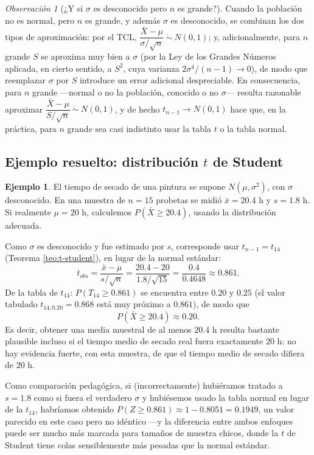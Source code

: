 \documentclass[11pt,a4paper]{article}
\theoremstyle{plain}
\theoremstyle{definition}
\newtheorem{ejemplo}[teorema]{Ejemplo}
\theoremstyle{remark}
\newtheorem{observacion}[teorema]{Observación}
\begin{document}
\begin{observacion}[¿Y si $\sigma$ es desconocido pero $n$ es grande?]
Cuando la población no es normal, pero $n$ es grande, y además $\sigma$ es desconocido, se combinan los dos tipos de aproximación: por el TCL, $\dfrac{\bar X-\mu}{\sigma/\sqrt n}\ \dot\sim\ N(0,1)$; y, adicionalmente, para $n$ grande $S$ se aproxima muy bien a $\sigma$ (por la Ley de los Grandes Números aplicada, en cierto sentido, a $S^2$, cuya varianza $2\sigma^4/(n-1)\to 0$), de modo que reemplazar $\sigma$ por $S$ introduce un error adicional despreciable. En consecuencia, para $n$ grande —normal o no la población, conocido o no $\sigma$— resulta razonable aproximar $\dfrac{\bar X-\mu}{S/\sqrt n}\ \dot\sim\ N(0,1)$, y de hecho $t_{n-1}\to N(0,1)$ hace que, en la práctica, para $n$ grande sea casi indistinto usar la tabla $t$ o la tabla normal.
\end{observacion}

\subsection{Ejemplo resuelto: distribución $t$ de Student}

\begin{ejemplo}
El tiempo de secado de una pintura se supone $N(\mu,\sigma^2)$, con $\sigma$ desconocido. En una muestra de $n=15$ probetas se midió $\bar x=20.4$ h y $s=1.8$ h. Si realmente $\mu=20$ h, calculemos $P(\bar X\geq 20.4)$, usando la distribución adecuada.

Como $\sigma$ es desconocido y fue estimado por $s$, corresponde usar $t_{n-1}=t_{14}$ (Teorema \ref{teo:t-student}), en lugar de la normal estándar:
$$t_{obs} = \frac{\bar x-\mu}{s/\sqrt n} = \frac{20.4-20}{1.8/\sqrt{15}} = \frac{0.4}{0.4648} \approx 0.861.$$
De la tabla de $t_{14}$: $P(T_{14}\geq 0.861)$ se encuentra entre $0.20$ y $0.25$ (el valor tabulado $t_{14;0.20}=0.868$ está muy próximo a $0.861$), de modo que
$$P(\bar X\geq 20.4)\approx 0.20.$$
Es decir, obtener una media muestral de al menos $20.4$ h resulta bastante plausible incluso si el tiempo medio de secado real fuera exactamente $20$ h: no hay evidencia fuerte, con esta muestra, de que el tiempo medio de secado difiera de $20$ h.

Como comparación pedagógica, si (incorrectamente) hubiéramos tratado a $s=1.8$ como si fuera el verdadero $\sigma$ y hubiésemos usado la tabla normal en lugar de la $t_{14}$, habríamos obtenido $P(Z\geq 0.861)\approx 1-0.8051=0.1949$, un valor parecido en este caso pero no idéntico —y la diferencia entre ambos enfoques puede ser mucho más marcada para tamaños de muestra chicos, donde la $t$ de Student tiene colas sensiblemente más pesadas que la normal estándar.
\end{ejemplo}
\end{document}
